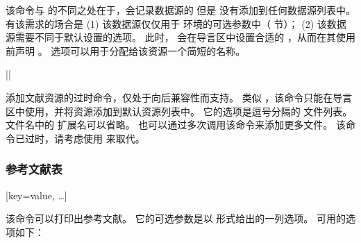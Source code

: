\begin{ltxsyntax}
该命令与  的不同之处在于，会记录数据源的  但是  没有添加到任何数据源列表中。
有该需求的场合是 (1) 该数据源仅仅用于  环境的可选参数中（ 节）；
(2) 该数据源需要不同于默认设置的选项。
此时， 会在导言区中设置合适的 ，从而在其使用前声明 。
 选项可以用于分配给该资源一个简短的名称。

|\DeprecatedMark|


添加文献资源的过时命令，仅处于向后兼容性而支持。
类似 ，该命令只能在导言区中使用，并将资源添加到默认资源列表中。
它的选项是逗号分隔的  文件列表。
文件名中的  扩展名可以省略。
也可以通过多次调用该命令来添加更多文件。
该命令已过时，请考虑使用  来取代。

\end{ltxsyntax}

\subsubsection{参考文献表}%
\label{use:bib:bib}

\begin{ltxsyntax}

[key=value, \dots]


该命令可以打印出参考文献。
它的可选参数是以 \keyval 形式给出的一列选项。
可用的选项如下：

\end{ltxsyntax}


